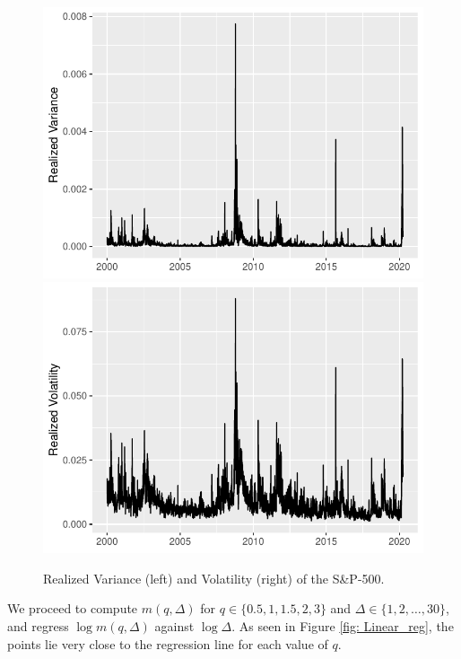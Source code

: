 \begin{figure}[H]
    \centering
    \includegraphics[scale=0.6]{fig/img/RealizedLib/SP500Realized.pdf}
    \includegraphics[scale=0.6]{fig/img/RealizedLib/SP500RealizedVol.pdf}
    \caption{Realized Variance (left) and Volatility (right) of the S\&P-500.}
    \label{fig:realized}
\end{figure}
We proceed to compute $m(q,\Delta)$ for $q\in \{0.5,1,1.5,2,3\}$ and $\Delta \in \{1,2,\dots,30\}$, and regress $\log m(q,\Delta)$ against $\log\Delta$. As seen in Figure \ref{fig: Linear_reg}, the points lie very close to the regression line for each value of $q$.
